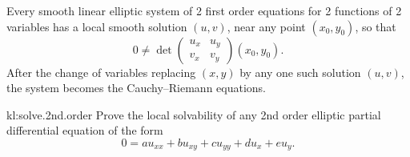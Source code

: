 \begin{theorem}
Every smooth linear elliptic system of 2 first order equations for 2 functions of 2 variables has a local smooth solution \((u,v)\), near any point \((x_0,y_0)\), so that 
\[
0 \ne 
\det
\begin{pmatrix}
u_x & u_y \\
v_x & v_y
\end{pmatrix}(x_0,y_0).
\]
After the change of variables replacing \((x,y)\) by any one such solution \((u,v)\), the system becomes the Cauchy--Riemann equations.
\end{theorem}
\begin{problem}{kl:solve.2nd.order}
Prove the local solvability of any 2nd order elliptic partial differential equation of the form
\[
0=au_{xx}+bu_{xy}+cu_{yy}+du_x+eu_y.
\]
\end{problem}
